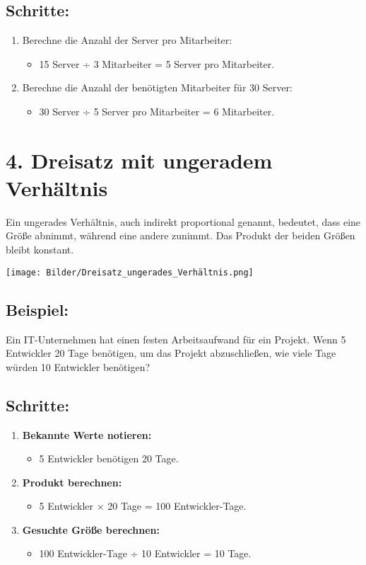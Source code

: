 \documentclass{orgstandard}
\begin{document}
\subsection{Schritte:}
\label{sec:org5abe4aa}
\begin{enumerate}
\item Berechne die Anzahl der Server pro Mitarbeiter:
\begin{itemize}
\item 15 Server ÷ 3 Mitarbeiter = 5 Server pro Mitarbeiter.
\end{itemize}
\item Berechne die Anzahl der benötigten Mitarbeiter für 30 Server:
\begin{itemize}
\item 30 Server ÷ 5 Server pro Mitarbeiter = 6 Mitarbeiter.
\end{itemize}
\end{enumerate}
\section{4. Dreisatz mit ungeradem Verhältnis}
\label{sec:org294a607}
Ein ungerades Verhältnis, auch indirekt proportional genannt, bedeutet, dass eine Größe abnimmt, während eine andere zunimmt. Das Produkt der beiden Größen bleibt konstant.

\begin{center}
\texttt{[image: Bilder/Dreisatz\_ungerades\_Verhältnis.png]}
\end{center}
\subsection{Beispiel:}
\label{sec:orgc7439b4}
Ein IT-Unternehmen hat einen festen Arbeitsaufwand für ein Projekt. Wenn 5 Entwickler 20 Tage benötigen, um das Projekt abzuschließen, wie viele Tage würden 10 Entwickler benötigen?
\subsection{Schritte:}
\label{sec:org33115a3}
\begin{enumerate}
\item \textbf{\textbf{Bekannte Werte notieren:}}
\begin{itemize}
\item 5 Entwickler benötigen 20 Tage.
\end{itemize}

\item \textbf{\textbf{Produkt berechnen:}}
\begin{itemize}
\item 5 Entwickler × 20 Tage = 100 Entwickler-Tage.
\end{itemize}

\item \textbf{\textbf{Gesuchte Größe berechnen:}}
\begin{itemize}
\item 100 Entwickler-Tage ÷ 10 Entwickler = 10 Tage.
\end{itemize}
\end{enumerate}
\end{document}
